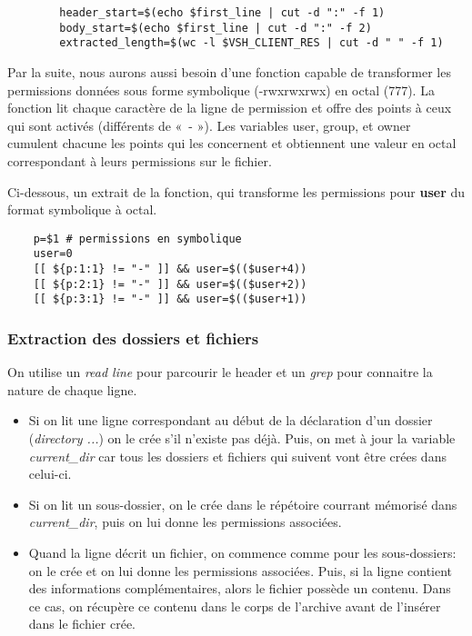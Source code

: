 \documentclass[titlepage]{article}
\begin{document}
	\begin{lstlisting}
		header_start=$(echo $first_line | cut -d ":" -f 1)
		body_start=$(echo $first_line | cut -d ":" -f 2) 
		extracted_length=$(wc -l $VSH_CLIENT_RES | cut -d " " -f 1)
	\end{lstlisting}

	Par la suite, nous aurons aussi besoin d’une fonction capable de transformer les permissions données sous forme symbolique (-rwxrwxrwx) en octal (777). La fonction lit chaque caractère de la ligne de permission et offre des points à ceux qui sont activés (différents de « - »). Les variables user, group, et owner cumulent chacune les points qui les concernent et obtiennent une valeur en octal correspondant à leurs permissions sur le fichier. 

	Ci-dessous, un extrait de la fonction, qui transforme les permissions pour \textbf{user} du format symbolique à octal.

	\begin{lstlisting}
	p=$1 # permissions en symbolique
	user=0
	[[ ${p:1:1} != "-" ]] && user=$(($user+4))
	[[ ${p:2:1} != "-" ]] && user=$(($user+2))
	[[ ${p:3:1} != "-" ]] && user=$(($user+1))
	\end{lstlisting}

	\subsubsection{Extraction des dossiers et fichiers}

	On utilise un \textit{read line} pour parcourir le header et un \textit{grep} pour connaitre la nature de chaque ligne.
	\begin{itemize}
		\item Si on lit une ligne correspondant au début de la déclaration d'un dossier (\textit{directory ...}) on le crée s’il n’existe pas déjà. Puis, on met à jour la variable \textit{current\_dir} car tous les dossiers et fichiers qui suivent vont être crées dans celui-ci.
		\item Si on lit un sous-dossier, on le crée dans le répétoire courrant mémorisé dans \textit{current\_dir}, puis on lui donne les permissions associées. 
		\item Quand la ligne décrit un fichier, on commence comme pour les sous-dossiers: on le crée et on lui donne les permissions associées. Puis, si la ligne contient des informations complémentaires, alors le fichier possède un contenu. Dans ce cas, on récupère ce contenu dans le corps de l'archive avant de l'insérer dans le fichier crée.
	\end{itemize}
\end{document}
